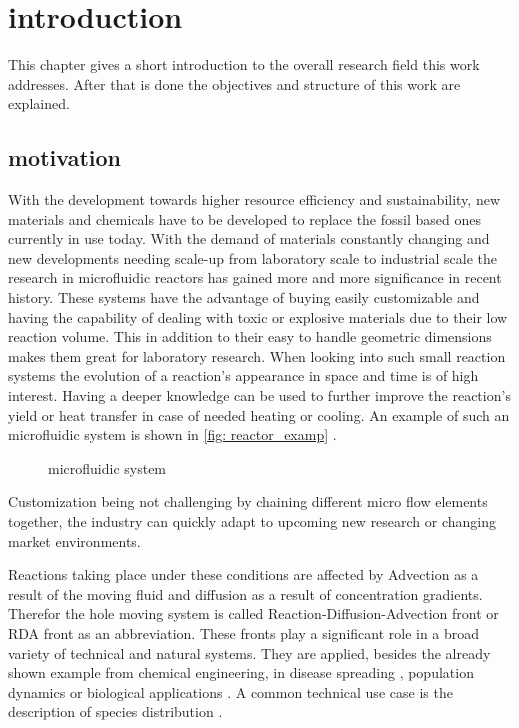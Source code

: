 \documentclass[../thesis.tex]{subfiles}
\begin{document}
\chapter{introduction}
\label{chp:introduction}

This chapter gives a short introduction to the overall research field this work addresses. After that is done the objectives and structure of this work are explained.

\section{motivation}

With the development towards higher resource efficiency and sustainability, new materials and chemicals have to be developed to replace the fossil based ones currently in use today. With the demand of materials constantly changing and new developments needing scale-up from laboratory scale to industrial scale the research in microfluidic reactors has gained more and more significance in recent history. These systems have the advantage of buying easily customizable and having the capability of dealing with toxic or explosive materials due to their low reaction volume. This in addition to their easy to handle geometric dimensions makes them great for laboratory research. When looking into such small reaction systems the evolution of a reaction's appearance in space and time is of high interest. Having a deeper knowledge can be used to further improve the reaction's yield or heat transfer in case of needed heating or cooling. An example of such an microfluidic system is shown in \autoref{fig: reactor_examp} \cite{corning}. 
\begin{figure}[htb]
	\centering
	\qquad
	\caption{microfluidic system}%
	\label{fig: reactor_examp}%
\end{figure}
Customization being not challenging by chaining different micro flow elements together, the industry can quickly adapt to upcoming new research or changing market environments.

Reactions taking place under these conditions are affected by Advection as a result of the moving fluid and diffusion as a result of concentration gradients. Therefor the hole moving system is called Reaction-Diffusion-Advection front or RDA front as an abbreviation.
These fronts play a significant role in a broad variety of technical and natural systems. They are applied, besides the already shown example from chemical engineering, in disease spreading \cite{kuto2017concentration}, population dynamics \cite{chen2018hopf, wang2019persistence} or biological applications \cite{zhao2011operator}. A common technical use case is the description of species distribution \cite{nakagaki1999reaction, von2013measurement}.
\end{document}

